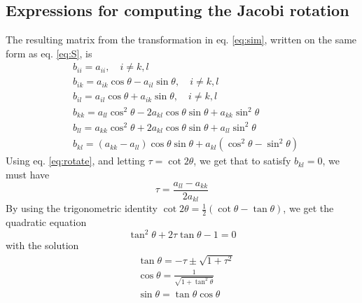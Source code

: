 \subsection*{Expressions for computing the Jacobi rotation}
 The resulting matrix from the transformation in eq. \ref{eq:sim}, written on the same form as eq. \ref{eq:S}, is
 \begin{equation}\label{eq:rotate}
 \begin{split}
 &b_{ii} = a_{ii}, \quad i\neq k,l  \\
 &b_{ik} = a_{ik}\cos{\theta} - a_{il}\sin \theta, \quad i\neq k,l \\
 &b_{il} = a_{il}\cos{\theta} + a_{ik}\sin \theta, \quad i\neq k,l \\
 &b_{kk} = a_{ll}\cos^2{\theta} - 2a_{kl}\cos{\theta}\sin{\theta} + a_{kk}\sin^2{\theta}  \\
 &b_{ll} = a_{kk}\cos^2{\theta} + 2a_{kl}\cos{\theta}\sin{\theta} + a_{ll}\sin^2{\theta}  \\
 &b_{kl} = \left( a_{kk} - a_{ll}\right) \cos{\theta}\sin{\theta} + a_{kl}\left( \cos^2\theta - \sin^2\theta\right)
 \end{split}
 \end{equation}
 Using eq. \ref{eq:rotate}, and letting $\tau = \cot{2\theta}$, we get that to satisfy $b_{kl}=0$, we must have
 \begin{equation}
  \tau =  \frac{a_{ll}-a_{kk}}{2a_{kl}}
 \end{equation}
 By using the trigonometric identity $\cot{2\theta} = \frac{1}{2}\left( \cot \theta - \tan \theta\right)$, we get the quadratic equation
 \begin{equation}
 \tan^2 \theta + 2\tau \tan \theta - 1 = 0
 \end{equation}
 with the solution
 \begin{equation}
 \begin{split}
 &\tan \theta = -\tau \pm \sqrt{1+\tau^2} \\
 &\cos \theta = \frac{1}{\sqrt{1+\tan^2 \theta}} \\
 &\sin \theta = \tan \theta \cos \theta
 \end{split}
 \end{equation}
